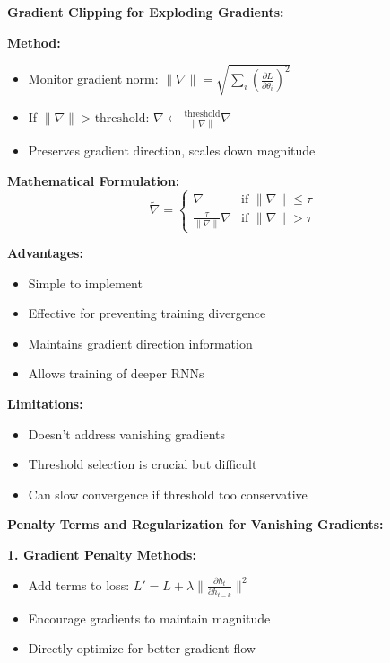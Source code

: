 \documentclass[12pt]{article}
\newcommand{\explanation}[1]{{\color{explanationcolor}#1}}
\begin{document}
\begin{enumerate}[(a)]
    \explanation{
    \textbf{Gradient Clipping for Exploding Gradients:}
    
    \textbf{Method:}
    \begin{itemize}
        \item Monitor gradient norm: $\|\nabla\| = \sqrt{\sum_i (\frac{\partial L}{\partial \theta_i})^2}$
        \item If $\|\nabla\| > \text{threshold}$: $\nabla \leftarrow \frac{\text{threshold}}{\|\nabla\|} \nabla$
        \item Preserves gradient direction, scales down magnitude
    \end{itemize}
    
    \textbf{Mathematical Formulation:}
    $$\tilde{\nabla} = \begin{cases} 
    \nabla & \text{if } \|\nabla\| \leq \tau \\
    \frac{\tau}{\|\nabla\|} \nabla & \text{if } \|\nabla\| > \tau
    \end{cases}$$
    
    \textbf{Advantages:}
    \begin{itemize}
        \item Simple to implement
        \item Effective for preventing training divergence
        \item Maintains gradient direction information
        \item Allows training of deeper RNNs
    \end{itemize}
    
    \textbf{Limitations:}
    \begin{itemize}
        \item Doesn't address vanishing gradients
        \item Threshold selection is crucial but difficult
        \item Can slow convergence if threshold too conservative
    \end{itemize}
    
    \textbf{Penalty Terms and Regularization for Vanishing Gradients:}
    
    \textbf{1. Gradient Penalty Methods:}
    \begin{itemize}
        \item Add terms to loss: $L' = L + \lambda \|\frac{\partial h_t}{\partial h_{t-k}}\|^2$
        \item Encourage gradients to maintain magnitude
        \item Directly optimize for better gradient flow
    \end{itemize}
    
}
\end{enumerate}
\end{document}
